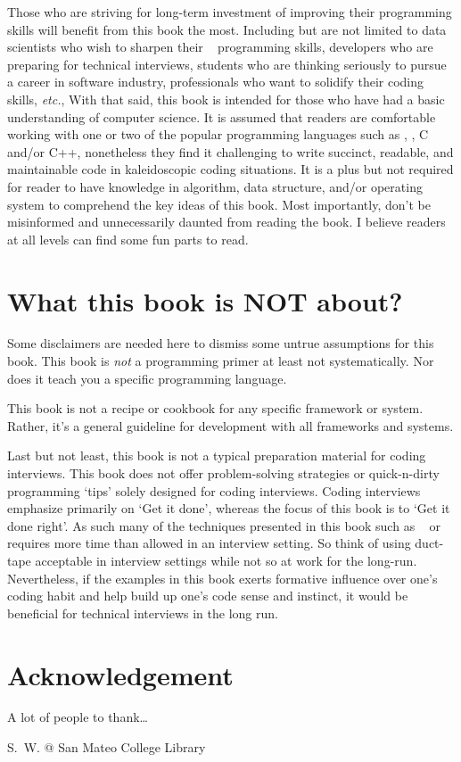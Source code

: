 Those who are striving for long-term investment of
improving their programming skills will benefit from this book the most.
Including but are not limited to data scientists who wish to sharpen their \python~ programming
skills, developers who are preparing for technical interviews, students who are thinking
seriously to pursue a career in software industry, professionals who want to solidify their coding
skills, \textit{etc.},
With that said, this book is intended for those who have had a basic understanding
of computer science.
It is assumed that readers are comfortable working with one or two of the popular
programming languages such as \python, \java, C and/or C++,
nonetheless they find it challenging to write succinct, readable, and maintainable code
in kaleidoscopic coding situations.
It is a plus but not required for reader to have knowledge in algorithm, data structure,
and/or operating system to comprehend the key ideas of this book.
Most importantly, don't be misinformed and unnecessarily daunted from reading the book.
I believe readers at all levels can find some fun parts to read.


\section{What this book is NOT about?}\label{sec:thisBookIsNotAbout}

Some disclaimers are needed here to dismiss some untrue assumptions for this book.
This book is \emph{not} a programming primer at least not systematically.
Nor does it teach you a specific programming language.


This book is not a recipe or cookbook for any specific framework or system.
Rather, it's a general guideline for development with all frameworks and systems.


Last but not least, this book is not a typical preparation material for coding interviews.
This book does not offer problem-solving strategies or
quick-n-dirty programming `tips' solely designed for coding interviews.
Coding interviews emphasize primarily on `Get it done',
whereas the focus of this book is to `Get it done right'.
As such many of the techniques presented in this book such as ~ or
~ requires more time than allowed in an interview setting.
So think of using duct-tape acceptable in interview settings while not so at work for the long-run.
Nevertheless, if the examples in this book exerts formative influence over one's coding habit and
help build up one's code sense and instinct, it would be beneficial for technical interviews
in the long run.


\section{Acknowledgement}\label{sec:acknowledgement}

A lot of people to thank\ldots


\begin{flushright}
    S.~W. @ San Mateo College Library
\end{flushright}

